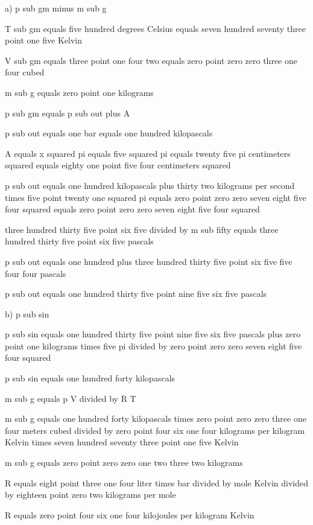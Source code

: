 a) p sub gm minus m sub g

T sub gm equals five hundred degrees Celsius equals seven hundred seventy three point one five Kelvin

V sub gm equals three point one four two equals zero point zero zero three one four cubed

m sub g equals zero point one kilograms

p sub gm equals p sub out plus A

p sub out equals one bar equals one hundred kilopascals

A equals x squared pi equals five squared pi equals twenty five pi centimeters squared equals eighty one point five four centimeters squared

p sub out equals one hundred kilopascals plus thirty two kilograms per second times five point twenty one squared pi equals zero point zero zero seven eight five four squared equals zero point zero zero seven eight five four squared

three hundred thirty five point six five divided by m sub fifty equals three hundred thirty five point six five pascals

p sub out equals one hundred plus three hundred thirty five point six five five four four pascals

p sub out equals one hundred thirty five point nine five six five pascals

b) p sub sin

p sub sin equals one hundred thirty five point nine five six five pascals plus zero point one kilograms times five pi divided by zero point zero zero seven eight five four squared

p sub sin equals one hundred forty kilopascals

m sub g equals p V divided by R T

m sub g equals one hundred forty kilopascals times zero point zero zero three one four meters cubed divided by zero point four six one four kilograms per kilogram Kelvin times seven hundred seventy three point one five Kelvin

m sub g equals zero point zero zero one two three two kilograms

R equals eight point three one four liter times bar divided by mole Kelvin divided by eighteen point zero two kilograms per mole

R equals zero point four six one four kilojoules per kilogram Kelvin